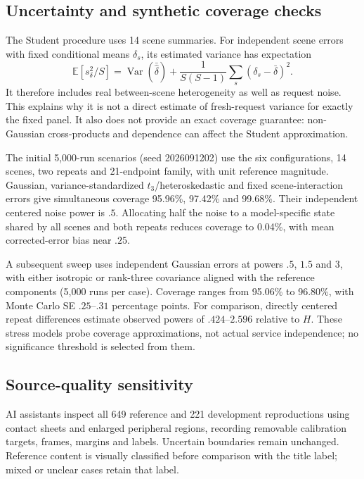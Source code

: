 \subsection{Uncertainty and synthetic coverage checks}
The Student procedure uses 14 scene summaries. For independent scene errors
with fixed conditional means $\delta_s$, its estimated variance has expectation
\[
 \mathbb E[s_\delta^2/S]
 =\operatorname{Var}(\bar{\widehat\delta})
 +\frac{1}{S(S-1)}\sum_s(\delta_s-\bar\delta)^2.
\]
It therefore includes real between-scene heterogeneity as well as request noise.
This explains why it is not a direct estimate of fresh-request variance for
exactly the fixed panel. It also does not provide an exact coverage guarantee:
non-Gaussian cross-products and dependence can affect the Student approximation.

The initial 5,000-run scenarios (seed 2026091202) use the six configurations,
14 scenes, two repeats and 21-endpoint family, with unit reference magnitude.
Gaussian, variance-standardized $t_3$/heteroskedastic and fixed scene-interaction
errors give simultaneous coverage 95.96\%, 97.42\% and 99.68\%. Their independent
centered noise power is $.5$. Allocating half the noise to a model-specific
state shared by all scenes and both repeats reduces coverage to 0.04\%, with
mean corrected-error bias near $.25$.

A subsequent sweep uses independent Gaussian errors at powers $.5$, $1.5$ and
$3$, with either isotropic or rank-three covariance aligned with the reference
components (5,000 runs per case). Coverage ranges from 95.06\% to 96.80\%, with
Monte Carlo SE $.25$--$.31$ percentage points. For comparison, directly centered
repeat differences estimate observed powers of $.424$--$2.596$ relative to $H$.
These stress models probe coverage approximations, not actual service independence;
no significance threshold is selected from them.

\subsection{Source-quality sensitivity}\label{app:reference-quality}
AI assistants inspect all 649 reference and 221 development reproductions
using contact sheets and enlarged peripheral regions, recording removable
calibration targets, frames, margins and labels. Uncertain boundaries remain
unchanged. Reference content is visually classified before comparison with the
title label; mixed or unclear cases retain that label.

